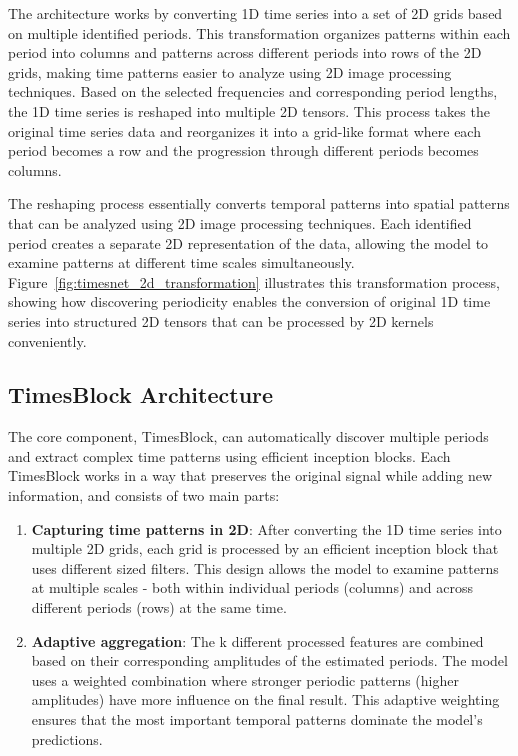 The architecture works by converting 1D time series into a set of 2D grids based on multiple identified periods. This transformation organizes patterns within each period into columns and patterns across different periods into rows of the 2D grids, making time patterns easier to analyze using 2D image processing techniques. Based on the selected frequencies and corresponding period lengths, the 1D time series is reshaped into multiple 2D tensors. This process takes the original time series data and reorganizes it into a grid-like format where each period becomes a row and the progression through different periods becomes columns.

The reshaping process essentially converts temporal patterns into spatial patterns that can be analyzed using 2D image processing techniques. Each identified period creates a separate 2D representation of the data, allowing the model to examine patterns at different time scales simultaneously.
Figure~\ref{fig:timesnet_2d_transformation} illustrates this transformation process, showing how discovering periodicity enables the conversion of original 1D time series into structured 2D tensors that can be processed by 2D kernels conveniently. 

\subsection{TimesBlock Architecture}

The core component, TimesBlock, can automatically discover multiple periods and extract complex time patterns using efficient inception blocks. Each TimesBlock works in a way that preserves the original signal while adding new information, and consists of two main parts:

\begin{enumerate}
\item \textbf{Capturing time patterns in 2D}: After converting the 1D time series into multiple 2D grids, each grid is processed by an efficient inception block that uses different sized filters. This design allows the model to examine patterns at multiple scales - both within individual periods (columns) and across different periods (rows) at the same time.

\item \textbf{Adaptive aggregation}: The k different processed features are combined based on their corresponding amplitudes of the estimated periods. The model uses a weighted combination where stronger periodic patterns (higher amplitudes) have more influence on the final result. This adaptive weighting ensures that the most important temporal patterns dominate the model's predictions.
\end{enumerate}

